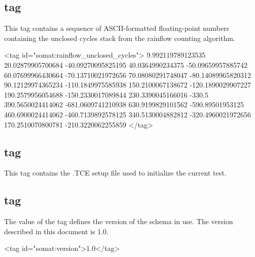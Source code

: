 \documentclass{article}
\newcommand{\somatver}{1.0}
\begin{document}
\subsection{ tag}

This tag contains a sequence of ASCII-formatted floating-point numbers
containing the unclosed cycles stack from the rainflow counting
algorithm.

\begin{siexmlexample}
<tag id="somat:rainflow_unclosed_cycles">
  9.992119789123535 20.02879905700684 -40.09270095825195
  40.0364990234375 -50.09659957885742 60.07699966430664
  -70.13710021972656 70.08080291748047 -80.14089965820312
  90.12129974365234 -110.1849975585938 150.2100067138672
  -120.1890029907227 190.2579956054688 -150.2330017089844
  230.3390045166016 -330.5 390.5650024414062 -681.0609741210938
  630.9199829101562 -590.89501953125 460.6900024414062
  -460.7139892578125 340.5130004882812 -320.4960021972656
  170.2510070800781 -210.3220062255859
</tag>
\end{siexmlexample}

\subsection{ tag}

This tag contains the .TCE setup file used to initialize the current
test.



\subsection{ tag}

The value of the  tag defines the version of the
 schema in use.  The version described in this document is
\somatver{}.

\begin{siexmlexample}
<tag id="somat:version">1.0</tag>
\end{siexmlexample}

\newcommand{\nondecreasing}[1]{The values of SIE dimension index #1,
  scaled or unscaled, have non-decreasing ordering}
\newcommand{\schemaheader} {\textbf{SIE dimension index} & 
  \textbf{Data type} & \textbf{Scaled} & \textbf{Unscaled}}
\end{document}
